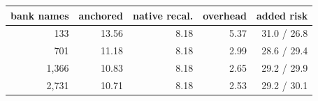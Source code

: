 \begin{tabular}{@{}rrrrr@{}}
\toprule
bank names & anchored & native recal. & overhead & added risk \\
\midrule
133 & 13.56 & 8.18 & 5.37 & 31.0 / 26.8 \\
701 & 11.18 & 8.18 & 2.99 & 28.6 / 29.4 \\
1,366 & 10.83 & 8.18 & 2.65 & 29.2 / 29.9 \\
2,731 & 10.71 & 8.18 & 2.53 & 29.2 / 30.1 \\
\bottomrule
\end{tabular}
